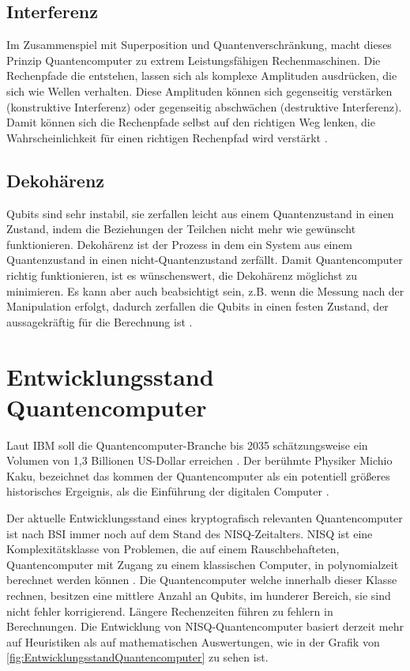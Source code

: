 \subsection{Interferenz}
Im Zusammenspiel mit Superposition und Quantenverschränkung, macht dieses Prinzip Quantencomputer zu extrem Leistungsfähigen Rechenmaschinen.
Die Rechenpfade die entstehen, lassen sich als komplexe Amplituden ausdrücken, die sich wie Wellen verhalten.
Diese Amplituden können sich gegenseitig verstärken (konstruktive Interferenz) oder gegenseitig abschwächen (destruktive Interferenz).
Damit können sich die Rechenpfade selbst auf den richtigen Weg lenken, die Wahrscheinlichkeit für einen richtigen Rechenpfad wird verstärkt \cite{molfettaQuantumComputingNew2026}.

\subsection{Dekohärenz}
Qubits sind sehr instabil, sie zerfallen leicht aus einem Quantenzustand in einen Zustand, indem die Beziehungen der Teilchen nicht mehr wie gewünscht funktionieren.
Dekohärenz ist der Prozess in dem ein System aus einem Quantenzustand in einen nicht-Quantenzustand zerfällt.
Damit Quantencomputer richtig funktionieren, ist es wünschenswert, die Dekohärenz möglichst zu minimieren.
Es kann aber auch beabsichtigt sein, z.B. wenn die Messung nach der Manipulation erfolgt, dadurch zerfallen die Qubits in einen festen Zustand,
der aussagekräftig für die Berechnung ist \cite{aumassonSeriousCryptographyPractical2018}.

\section{Entwicklungsstand Quantencomputer}
Laut IBM soll die Quantencomputer-Branche bis 2035 schätzungsweise ein Volumen von 1,3 Billionen US-Dollar erreichen \cite{smalleyWasIstQuantencomputing2025}.
Der berühmte Physiker Michio Kaku, bezeichnet das kommen der Quantencomputer als ein potentiell größeres historisches Ergeignis, als die Einführung der digitalen Computer \cite{bigthinkMichioKakuQuantum2023}.

Der aktuelle Entwicklungsstand eines kryptografisch relevanten Quantencomputer ist nach BSI immer noch auf dem Stand des NISQ-Zeitalters.
NISQ ist eine Komplexitätsklasse von Problemen, die auf einem Rauschbehafteten, Quantencomputer mit Zugang zu einem klassischen Computer, in polynomialzeit berechnet werden können \cite{chenComplexityNISQ2023}.
Die Quantencomputer welche innerhalb dieser Klasse rechnen, besitzen eine mittlere Anzahl an Qubits, im hunderer Bereich, sie sind nicht fehler korrigierend.
Längere Rechenzeiten führen zu fehlern in Berechnungen.
Die Entwicklung von NISQ-Quantencomputer basiert derzeit mehr auf Heuristiken als auf mathematischen Auswertungen, wie in der Grafik von \ref{fig:EntwicklungsstandQuantencomputer} zu sehen ist.

